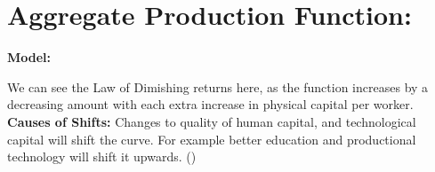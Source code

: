 \documentclass{article}
\begin{document}
\section{Aggregate Production Function:}

\textbf{Model:}
We can see the Law of Dimishing returns here, as the function increases by a decreasing amount with each extra increase in physical capital per worker.
\textbf{Causes of Shifts:}
Changes to quality of human capital, and technological capital will shift the curve. For example better education and productional technology will shift it upwards.  
\newpage()
\end{document}
